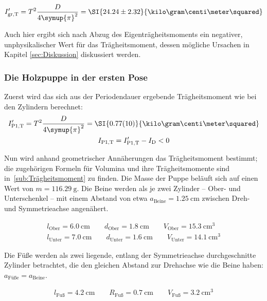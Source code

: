 \begin{gather}
    I'_\text{gr,T}=T^2\frac{D}{4\symup{\pi}^2}=\SI{24.24\pm2.32}{\kilo\gram\centi\meter\squared} 
\end{gather}

Auch hier ergibt sich nach Abzug des Eigenträgheitsmoments ein negativer, unphysikalischer Wert für das Trägheitsmoment, 
dessen mögliche Ursachen in Kapitel \ref{sec:Diskussion} diskussiert werden. 

\FloatBarrier
\subsubsection{Die Holzpuppe in der ersten Pose}

Zuerst wird das sich aus der Periodendauer ergebende Trägheitsmoment wie bei den Zylindern berechnet: 
\begin{gather}
    I'_\text{P1,T}=T^2\frac{D}{4\symup{\pi}^2}=\SI{0.77(10)}{\kilo\gram\centi\meter\squared} \\
    I_\text{P1,T}=I'_\text{P1,T}-I_\text{D} <0 
\end{gather}

Nun wird anhand geometrischer Annäherungen das Trägheitsmoment bestimmt; die zugehörigen Formeln für Volumina und ihre 
Trägheitsmomente sind in~\ref{sub:Trägheitsmoment} zu finden. 
Die Masse der Puppe beläuft sich auf einen Wert von ${m=\SI{116.29}{\gram}}$. 
Die Beine werden als je zwei Zylinder -- Ober- und Unterschenkel -- mit einem Abstand von etwa 
${a_\text{Beine}=\SI{1.25}{\centi\meter}}$ zwischen Dreh- und Symmetrieachse angenähert.  

\begin{gather}
    l_\text{Ober}=\SI{6.0}{\centi\meter} \quad \quad
    d_\text{Ober}=\SI{1.8}{\centi\meter} \quad \quad
    V_\text{Ober}=\SI{15.3}{\centi\meter\tothe{3}} \\
    l_\text{Unter}=\SI{7.0}{\centi\meter} \quad \quad
    d_\text{Unter}=\SI{1.6}{\centi\meter} \quad \quad
    V_\text{Unter}=\SI{14.1}{\centi\meter\tothe{3}} 
\end{gather}

Die Füße werden als zwei liegende, entlang der Symmetrieachse durchgeschnitte Zylinder betrachtet, die den gleichen 
Abstand zur Drehachse wie die Beine haben: ${a_\text{Füße}=a_\text{Beine}}$. 

\begin{gather}
    l_\text{Fuß}=\SI{4.2}{\centi\meter} \quad \quad 
    R_\text{Fuß}=\SI{0.7}{\centi\meter} \quad \quad
    V_\text{Fuß}=\SI{3.2}{\centi\meter\tothe{3}}
\end{gather}

